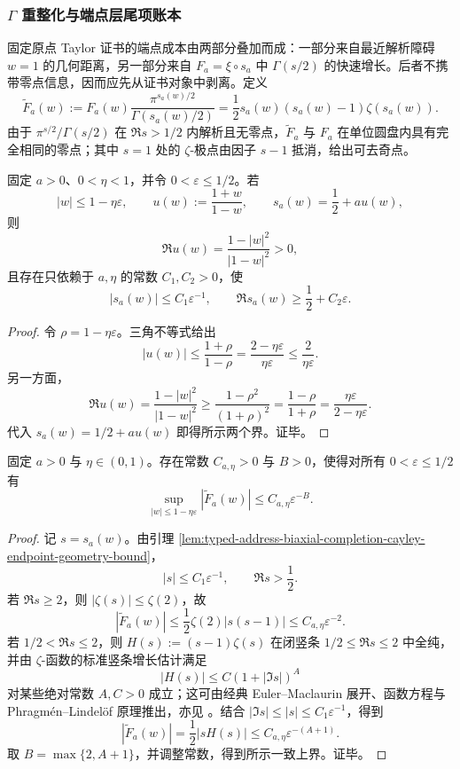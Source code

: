 \subsubsection{\texorpdfstring{\(\Gamma\)}{Gamma} 重整化与端点层尾项账本}\label{subsubsec:typed-address-biaxial-completion-gamma-renormalized-endpoint-budget}
固定原点 Taylor 证书的端点成本由两部分叠加而成：一部分来自最近解析障碍 \(w=1\) 的几何距离，另一部分来自 \(F_a=\xi\circ s_a\) 中 \(\Gamma(s/2)\) 的快速增长。后者不携带零点信息，因而应先从证书对象中剥离。定义
\[
\widetilde F_a(w)
:=
F_a(w)\frac{\pi^{s_a(w)/2}}{\Gamma(s_a(w)/2)}
=
\frac12s_a(w)(s_a(w)-1)\zeta(s_a(w)).
\]
由于 \(\pi^{s/2}/\Gamma(s/2)\) 在 \(\Re s>1/2\) 内解析且无零点，\(\widetilde F_a\) 与 \(F_a\) 在单位圆盘内具有完全相同的零点；其中 \(s=1\) 处的 \(\zeta\)-极点由因子 \(s-1\) 抵消，给出可去奇点。

\begin{lemma}\label{lem:typed-address-biaxial-completion-cayley-endpoint-geometry-bound}
固定 \(a>0\)、\(0<\eta<1\)，并令 \(0<\varepsilon\le1/2\)。若
\[
|w|\le 1-\eta\varepsilon,\qquad
u(w):=\frac{1+w}{1-w},\qquad
s_a(w)=\frac12+au(w),
\]
则
\[
\Re u(w)=\frac{1-|w|^2}{|1-w|^2}>0,
\]
且存在只依赖于 \(a,\eta\) 的常数 \(C_1,C_2>0\)，使
\[
|s_a(w)|\le C_1\varepsilon^{-1},
\qquad
\Re s_a(w)\ge \frac12+C_2\varepsilon .
\]
\end{lemma}
\begin{proof}
令 \(\rho=1-\eta\varepsilon\)。三角不等式给出
\[
|u(w)|\le \frac{1+\rho}{1-\rho}
=\frac{2-\eta\varepsilon}{\eta\varepsilon}
\le \frac{2}{\eta\varepsilon}.
\]
另一方面，
\[
\Re u(w)=\frac{1-|w|^2}{|1-w|^2}
\ge
\frac{1-\rho^2}{(1+\rho)^2}
=
\frac{1-\rho}{1+\rho}
=
\frac{\eta\varepsilon}{2-\eta\varepsilon}.
\]
代入 \(s_a(w)=1/2+au(w)\) 即得所示两个界。证毕。
\end{proof}

\begin{proposition}[重整化函数的端点多项式增长]\label{prop:typed-address-biaxial-completion-renormalized-polynomial-endpoint-growth}
固定 \(a>0\) 与 \(\eta\in(0,1)\)。存在常数 \(C_{a,\eta}>0\) 与 \(B>0\)，使得对所有 \(0<\varepsilon\le1/2\) 有
\[
\sup_{|w|\le 1-\eta\varepsilon}
|\widetilde F_a(w)|
\le
C_{a,\eta}\varepsilon^{-B}.
\]
\end{proposition}
\begin{proof}
记 \(s=s_a(w)\)。由引理 \ref{lem:typed-address-biaxial-completion-cayley-endpoint-geometry-bound}，
\[
|s|\le C_1\varepsilon^{-1},
\qquad
\Re s>\frac12.
\]
若 \(\Re s\ge2\)，则 \(|\zeta(s)|\le\zeta(2)\)，故
\[
|\widetilde F_a(w)|
\le
\frac12\zeta(2)|s(s-1)|
\le
C_{a,\eta}\varepsilon^{-2}.
\]
若 \(1/2<\Re s\le2\)，则 \(H(s):=(s-1)\zeta(s)\) 在闭竖条 \(1/2\le\Re s\le2\) 中全纯，并由 \(\zeta\)-函数的标准竖条增长估计满足
\[
|H(s)|\le C(1+|\Im s|)^A
\]
对某些绝对常数 \(A,C>0\) 成立；这可由经典 Euler--Maclaurin 展开、函数方程与 Phragm\'en--Lindel\"of 原理推出，亦见 \cite{Titchmarsh1986RiemannZeta}。结合 \(|\Im s|\le |s|\le C_1\varepsilon^{-1}\)，得到
\[
|\widetilde F_a(w)|
=
\frac12|sH(s)|
\le
C_{a,\eta}\varepsilon^{-(A+1)}.
\]
取 \(B=\max\{2,A+1\}\)，并调整常数，得到所示一致上界。证毕。
\end{proof}

